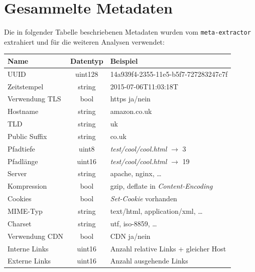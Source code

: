 \documentclass[a4paper,12pt,titlepage=false]{scrreprt}
\begin{document}
\section{Gesammelte Metadaten}
\label{csv-data}

Die in folgender Tabelle beschriebenen Metadaten wurden vom \texttt{meta-extractor}
extrahiert und für die weiteren Analysen verwendet:

\begin{center}
\begin{tabular}{lcl}
    \textbf{Name}  & \textbf{Datentyp} & \textbf{Beispiel} \\ \hline\hline
    UUID           & uint128           & \textcolor{light-gray}{14a939f4-2355-11e5-b5f7-727283247c7f} \\ \hline
    Zeitstempel    & string            & \textcolor{light-gray}{2015-07-06T11:03:18T} \\ \hline
    Verwendung TLS & bool              & https ja/nein \\ \hline
    Hostname       & string            & \textcolor{light-gray}{amazon.co.uk} \\ \hline
    TLD            & string            & \textcolor{light-gray}{uk} \\ \hline
    Public Suffix  & string            & \textcolor{light-gray}{co.uk} \\ \hline
    Pfadtiefe      & uint8             & \textit{test/cool/cool.html} $\rightarrow$ \textcolor{light-gray}{3} \\ \hline
    Pfadlänge      & uint16            & \textit{test/cool/cool.html} $\rightarrow$ \textcolor{light-gray}{19} \\ \hline
    Server         & string            & \textcolor{light-gray}{apache}, \textcolor{light-gray}{nginx}, \dots \\ \hline
    Kompression    & bool              & \textcolor{light-gray}{gzip}, \textcolor{light-gray}{deflate} in \textit{Content-Encoding} \\ \hline
    Cookies        & bool              & \textit{Set-Cookie} vorhanden \\ \hline
    MIME-Typ       & string            & \textcolor{light-gray}{text/html}, \textcolor{light-gray}{application/xml}, \dots\\ \hline
    Charset        & string            & \textcolor{light-gray}{utf}, \textcolor{light-gray}{iso-8859}, \dots \\ \hline
    Verwendung CDN & bool              & CDN ja/nein \\ \hline
    Interne Links  & uint16            & Anzahl relative Links + gleicher Host \\ \hline
    Externe Links  & uint16            & Anzahl ausgehende Links
\end{tabular}
\end{center}
\end{document}
